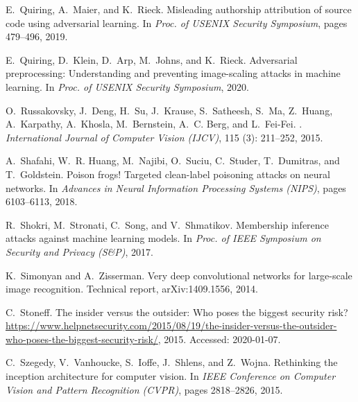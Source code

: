 \documentclass[conference]{IEEEtran}
\begin{document}
{\begin{thebibliography}{21}
	E.~Quiring, A.~Maier, and K.~Rieck.
	\newblock Misleading authorship attribution of source code using 
	adversarial
	learning.
	\newblock In \emph{Proc. of {USENIX} Security Symposium}, pages 
	479--496, 2019.
	
	E.~Quiring, D.~Klein, D.~Arp, M.~Johns, and K.~Rieck.
	\newblock Adversarial preprocessing: Understanding and preventing 
	image-scaling
	attacks in machine learning.
	\newblock In \emph{Proc. of USENIX Security Symposium}, 2020.
	
	O.~Russakovsky, J.~Deng, H.~Su, J.~Krause, S.~Satheesh, S.~Ma, 
	Z.~Huang,
	A.~Karpathy, A.~Khosla, M.~Bernstein, A.~C. Berg, and L.~Fei-Fei.
	.
	\newblock \emph{International Journal of Computer Vision (IJCV)}, 
	115
	(3): 211--252, 2015.
	
	A.~Shafahi, W.~R. Huang, M.~Najibi, O.~Suciu, C.~Studer, 
	T.~Dumitras, and
	T.~Goldstein.
	\newblock Poison frogs! {T}argeted clean-label poisoning attacks on 
	neural
	networks.
	\newblock In \emph{Advances in Neural Information Processing 
	Systems ({NIPS})},
	pages 6103--6113, 2018.
	
	R.~Shokri, M.~Stronati, C.~Song, and V.~Shmatikov.
	\newblock Membership inference attacks against machine learning 
	models.
	\newblock In \emph{Proc. of {IEEE} Symposium on Security and 
	Privacy ({S\&P})},
	2017.
	
	K.~Simonyan and A.~Zisserman.
	\newblock Very deep convolutional networks for large-scale image 
	recognition.
	\newblock Technical report, arXiv:1409.1556, 2014.
	
	C.~Stoneff.
	\newblock The insider versus the outsider: Who poses the biggest 
	security risk?
	\newblock
	\url{https://www.helpnetsecurity.com/2015/08/19/the-insider-versus-the-outsider-who-poses-the-biggest-security-risk/},
	2015.
	\newblock Accessed: 2020-01-07.
	
	C.~Szegedy, V.~Vanhoucke, S.~Ioffe, J.~Shlens, and Z.~Wojna.
	\newblock Rethinking the inception architecture for computer vision.
	\newblock In \emph{IEEE Conference on Computer Vision and Pattern 
	Recognition
		(CVPR)}, pages 2818--2826, 2015.
	

\end{thebibliography}}
\end{document}
